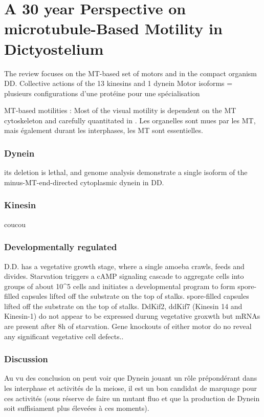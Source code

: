 \documentclass[twocolumn,10pt]{article} %
\begin{document}
\section{A 30 year Perspective on microtubule-Based Motility in Dictyostelium }
\cite{Koonce_2020}
The review focuses on the MT-based set of motors and in the compact organism DD. 
Collective actions of the 13 kinesins and 1 dynein 
Motor isoforms = plusieurs configurations d’une protéine pour une spécialisation

MT-based motilities : Most of the visual motility is dependent on the MT cytoskeleton and carefully quantitated in
 \cite{Roos_1987}. Les organelles sont mues par les MT, mais également durant les interphases, les MT sont essentielles. 

 \subsubsection*{Dynein}
its deletion is lethal, and genome analysis demonstrate a single isoform of the minus-MT-end-directed cytoplasmic dynein in DD. 
\subsubsection*{Kinesin}
coucou
\subsubsection*{Developmentally regulated}
D.D. has a vegetative growth stage, where a single amoeba crawls, feeds and divides. Starvation triggers a cAMP signaling cascade to aggregate cells into groups of about 10\^{}5 cells and initiates a developmental program to form spore-filled capsules lifted off the substrate on the top of stalks.
spore-filled capsules lifted off the substrate on the top of stalks.
DdKif2, ddKif7 (Kinesin 14 and Kinesin-1) do not appear to be expressed durung vegetative groxwth but mRNAs are present after 8h of starvation. 
Gene knockouts of either motor do no reveal any significant vegetative cell defects.\cite{deHostos_1998}.

\subsubsection*{Discussion}
Au vu des conclusion on peut voir que Dynein jouant un rôle prépondérant dans les interphase et activités de la meiose,
 il est un bon candidat de marquage pour ces activités (sous réserve de faire un mutant fluo et que la production de 
 Dynein soit suffisiament plus éleveées à ces moments).

\end{document}
